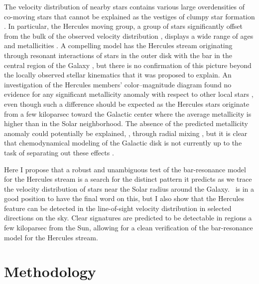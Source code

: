 The velocity distribution of nearby stars contains various large
overdensities of co-moving stars that cannot be explained as the
vestiges of clumpy star formation \citep[\eg,][]{Bovy10a}. In
particular, the Hercules moving group, a group of stars significantly
offset from the bulk of the observed velocity distribution
\citep[\eg,][see
  \figurename~\ref{fig:obs}]{1998AJ....115.2384D,Bovyveldist},
displays a wide range of ages and metallicities
\citep{Blaauw70a,Raboud98a,Caloi99a,Bensby07a,Bovy10a}. A compelling
model has the Hercules stream originating through resonant
interactions of stars in the outer disk with the bar in the central
region of the Galaxy \citep{dehnen00a,fux01a}, but there is no
confirmation of this picture beyond the locally observed stellar
kinematics that it was proposed to explain. An investigation of the
Hercules members' color--magnitude diagram found no evidence for any
significant metallicity anomaly with respect to other local stars
\citep{Bovy10a}, even though such a difference should be expected as
the Hercules stars originate from a few kiloparsec toward the Galactic
center where the average metallicity is higher than in the Solar
neighborhood. The absence of the predicted metallicity anomaly could
potentially be explained, \eg, through radial mixing
\citep{sellwood02a}, but it is clear that chemodynamical modeling of
the Galactic disk is not currently up to the task of separating out
these effects \citep[\eg,][]{samland03a,roskar08a}.

Here I propose that a robust and unambiguous test of the bar-resonance
model for the Hercules stream is a search for the distinct pattern it
predicts as we trace the velocity distribution of stars near the Solar
radius around the Galaxy. \Gaia\ is in a good position to have the
final word on this, but I also show that the Hercules feature can be
detected in the line-of-sight velocity distribution in selected
directions on the sky. Clear signatures are predicted to be detectable
in regions a few kiloparsec from the Sun, allowing for a clean
verification of the bar-resonance model for the Hercules stream.


\section{Methodology}\label{sec:method}

